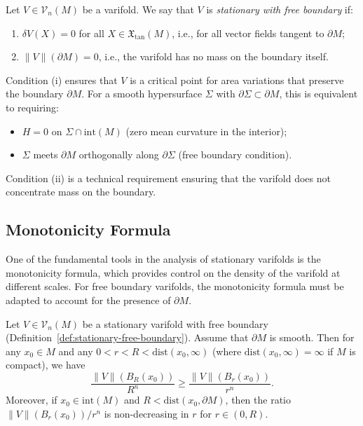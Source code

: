 \begin{definition}\label{def:stationary-free-boundary}
Let $V \in \mathcal{V}_n(M)$ be a varifold. We say that $V$ is \emph{stationary with free boundary} if:
\begin{enumerate}[label=(\roman*)]
    \item $\delta V(X) = 0$ for all $X \in \mathfrak{X}_{\tan}(M)$, i.e., for all vector fields tangent
    to $\partial M$;
    \item $\|V\|(\partial M) = 0$, i.e., the varifold has no mass on the boundary itself.
\end{enumerate}
\end{definition}

\begin{remark}
Condition (i) ensures that $V$ is a critical point for area variations that preserve the boundary
$\partial M$. For a smooth hypersurface $\Sigma$ with $\partial \Sigma \subset \partial M$, this is
equivalent to requiring:
\begin{itemize}
    \item $H = 0$ on $\Sigma \cap \mathrm{int}(M)$ (zero mean curvature in the interior);
    \item $\Sigma$ meets $\partial M$ orthogonally along $\partial \Sigma$ (free boundary condition).
\end{itemize}
Condition (ii) is a technical requirement ensuring that the varifold does not concentrate mass on the
boundary.
\end{remark}

\subsection{Monotonicity Formula}\label{subsec:monotonicity}

One of the fundamental tools in the analysis of stationary varifolds is the monotonicity formula, which provides control on the density of the varifold at different scales. For free boundary varifolds, the monotonicity formula must be adapted to account for the presence of $\partial M$.
\begin{theorem}\label{thm:monotonicity-free-boundary}
Let $V \in \mathcal{V}_n(M)$ be a stationary varifold with free boundary (Definition~\ref{def:stationary-free-boundary}). Assume that $\partial M$ is smooth. Then for any $x_0 \in M$ and any $0 < r < R < \mathrm{dist}(x_0, \infty)$ (where $\mathrm{dist}(x_0, \infty) = \infty$ if $M$ is compact), we have
\[
    \frac{\|V\|(B_R(x_0))}{R^n} \geq \frac{\|V\|(B_r(x_0))}{r^n}.
\]
Moreover, if $x_0 \in \mathrm{int}(M)$ and $R < \mathrm{dist}(x_0, \partial M)$, then the ratio
$\|V\|(B_r(x_0))/r^n$ is non-decreasing in $r$ for $r \in (0, R)$.
\end{theorem}

